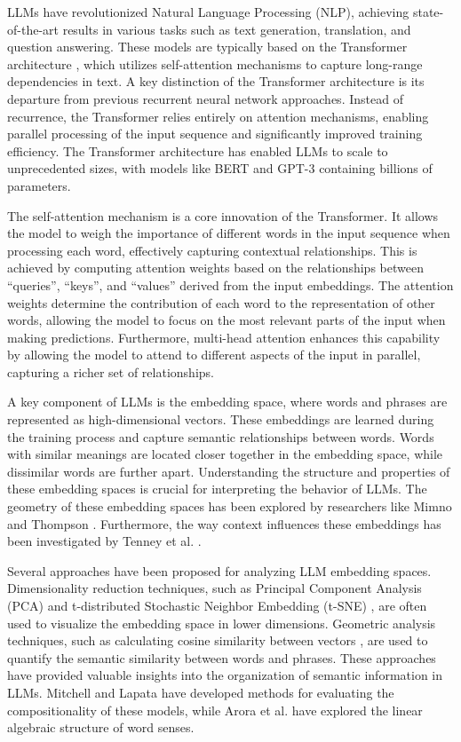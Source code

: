 \documentclass[prd,amsmath,amssymb,12pt]{revtex4}
\begin{document}
LLMs have revolutionized Natural Language Processing (NLP),
achieving state-of-the-art results in various tasks such as text generation, translation,
and question answering. These models are typically based on the Transformer
architecture \cite{transformer}, which utilizes self-attention mechanisms to
capture long-range dependencies in text.  A key distinction of the Transformer architecture
is its departure from previous recurrent neural network approaches.  Instead of recurrence,
the Transformer relies entirely on attention mechanisms, enabling parallel processing of
the input sequence and significantly improved training efficiency. The Transformer
architecture has enabled LLMs to scale to unprecedented sizes, with models like
BERT \citep{devlin}
and GPT-3 \citep{brown} containing billions of parameters.

The self-attention mechanism is a core innovation of the Transformer. It allows
the model to weigh the importance of different words in the input sequence when
processing each word, effectively capturing contextual relationships. This is
achieved by computing attention weights based on the relationships between
``queries'', ``keys'', and ``values'' derived from the input embeddings. The attention
weights determine the contribution of each word to the representation of other words,
allowing the model to focus on the most relevant parts of the input when making predictions.
Furthermore, multi-head attention enhances this capability by allowing the model to attend to
different aspects of the input in parallel, capturing a richer set of relationships.

A key component of LLMs is the embedding space, where words and phrases are represented
as high-dimensional vectors. These embeddings are learned during the training process
and capture semantic relationships between words. Words with similar meanings are
located closer together in the embedding space, while dissimilar words are further apart.
Understanding the structure and properties of these embedding spaces is crucial for
interpreting the behavior of LLMs. The geometry of these embedding spaces has been explored
by researchers like Mimno and Thompson \citep{mimno}. Furthermore, the
way context influences these embeddings has been investigated by Tenney et al. \citep{tenney}.

Several approaches have been proposed for analyzing LLM embedding spaces. Dimensionality
reduction techniques, such as Principal Component Analysis (PCA) \cite{PCA} and t-distributed
Stochastic Neighbor Embedding (t-SNE) \cite{tSNE}, are often used to visualize the
embedding space in lower dimensions. Geometric analysis techniques, such as calculating
cosine similarity between vectors \cite{cosine}, are used to quantify the semantic similarity
between words and phrases. These approaches have provided valuable insights into the organization
of semantic information in LLMs. Mitchell and Lapata \citep{mitchell} have developed
methods for evaluating the compositionality of these models, while Arora et al. \citep{arora}
have explored the linear algebraic structure of word senses.
\end{document}
